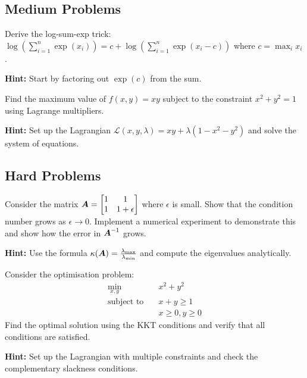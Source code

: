 \subsection{Medium Problems}

\begin{problem}
\label{prob:log-sum-exp}
Derive the log-sum-exp trick: $\log\left(\sum_{i=1}^n \exp(x_i)\right) = c + \log\left(\sum_{i=1}^n \exp(x_i - c)\right)$ where $c = \max_i x_i$.

\textbf{Hint:} Start by factoring out $\exp(c)$ from the sum.
\end{problem}

\begin{problem}
\label{prob:lagrange-multipliers}
Find the maximum value of $f(x, y) = xy$ subject to the constraint $x^2 + y^2 = 1$ using Lagrange multipliers.

\textbf{Hint:} Set up the Lagrangian $\mathcal{L}(x, y, \lambda) = xy + \lambda(1 - x^2 - y^2)$ and solve the system of equations.
\end{problem}

\subsection{Hard Problems}

\begin{problem}
\label{prob:matrix-inversion-stability}
Consider the matrix $\boldsymbol{A} = \begin{bmatrix} 1 & 1 \\ 1 & 1 + \epsilon \end{bmatrix}$ where $\epsilon$ is small. Show that the condition number grows as $\epsilon \to 0$. Implement a numerical experiment to demonstrate this and show how the error in $\boldsymbol{A}^{-1}$ grows.

\textbf{Hint:} Use the formula $\kappa(\boldsymbol{A}) = \frac{\lambda_{\max}}{\lambda_{\min}}$ and compute the eigenvalues analytically.
\end{problem}

\begin{problem}
\label{prob:kkt-conditions}
Consider the optimisation problem:
\begin{align}
\min_{x, y} \quad & x^2 + y^2 \\
\text{subject to} \quad & x + y \geq 1 \\
& x \geq 0, y \geq 0
\end{align}
Find the optimal solution using the KKT conditions and verify that all conditions are satisfied.

\textbf{Hint:} Set up the Lagrangian with multiple constraints and check the complementary slackness conditions.
\end{problem}
